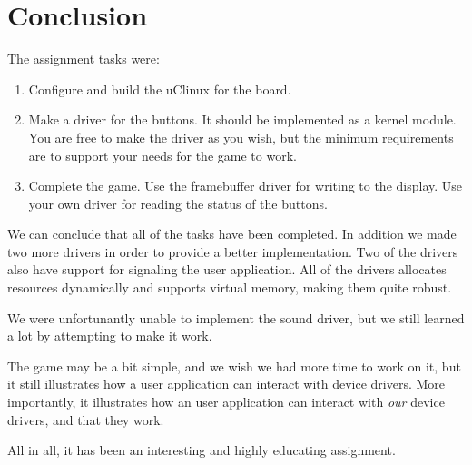 \section{Conclusion}

The assignment tasks were: 

\begin{enumerate}
	\item Configure and build the uClinux for the board.
	\item Make a driver for the buttons. It should be implemented as a kernel module. You are
	free to make the driver as you wish, but the minimum requirements are to support your
	needs for the game to work.
	\item Complete the game. Use the framebuffer driver for writing to the display. Use your own	driver for reading the status of the buttons.
\end{enumerate}

We can conclude that all of the tasks have been completed. In addition we made two more drivers in order to provide a better implementation. Two of the drivers also have support for signaling the user application. All of the drivers allocates resources dynamically and supports virtual memory, making them quite robust. 

We were unfortunantly unable to implement the sound driver, but we still learned a lot by attempting to make it work. 

The game may be a bit simple, and we wish we had more time to work on it, but it still illustrates how a user application can interact with device drivers. More importantly, it illustrates how an user application can interact with \emph{our} device drivers, and that they work. 

All in all, it has been an interesting and highly educating assignment. 
 